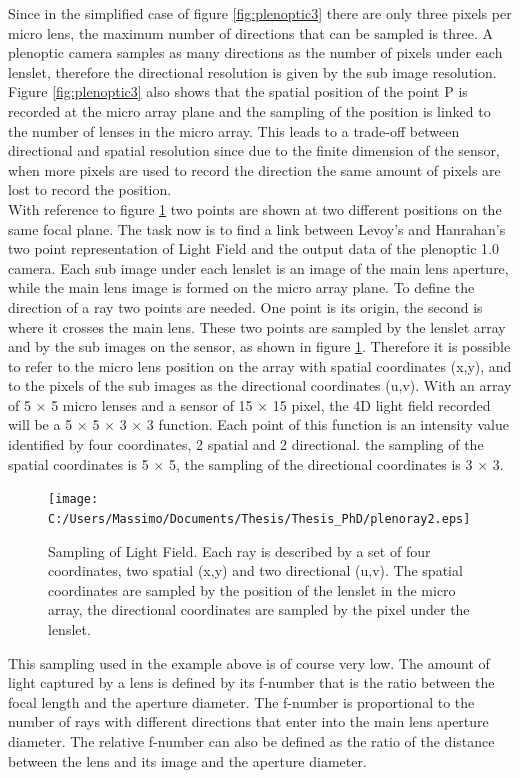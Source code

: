 Since in the simplified case of figure \ref{fig:plenoptic3} there are only three pixels per micro lens, the maximum number of directions that can be sampled is three. A plenoptic camera samples as many directions as the number of pixels under each lenslet, therefore the directional resolution is given by the sub image resolution. Figure \ref{fig:plenoptic3} also shows that the spatial position of the point P is recorded at the micro array plane and the sampling of the position is linked to the number of lenses in the micro array. This leads to a trade-off between directional and spatial resolution since due to the finite dimension of the sensor, when more pixels are used to record the direction the same amount of pixels are lost to record the position. \\
With reference to figure \ref{fig:plenoptic4} two points are shown at two different positions on the same focal plane. The task now is to find a link between Levoy's and Hanrahan's two point representation of Light Field \cite{levoy1996light,levoy2006microscope} and the output data of the plenoptic 1.0 camera. Each sub image under each lenslet is an image of the main lens aperture, while the main lens image is formed on the micro array plane. To define the direction of a ray two points are needed. One point is its origin, the second is where it crosses the main lens. These two points are sampled by the lenslet array and by the sub images on the sensor, as shown in figure \ref{fig:plenoptic4}. Therefore it is possible to refer to the micro lens position on the array with spatial coordinates (x,y), and to the pixels of the sub images as the directional coordinates (u,v). With an array of 5 $\times$ 5 micro lenses and a sensor of 15 $\times$ 15 pixel, the 4D light field recorded will be a 5 $\times$ 5 $\times$ 3 $\times$ 3 function. Each point of this function is an intensity value identified by four coordinates, 2 spatial and 2 directional. the sampling of the spatial coordinates is 5 $\times$ 5, the sampling of the directional coordinates is 3 $\times$ 3. 
\begin{figure}[H]
	\centering
	\texttt{[image: C:/Users/Massimo/Documents/Thesis/Thesis\_PhD/plenoray2.eps]}
	\caption{\label{fig:plenoptic4} Sampling of Light Field. Each ray is described by a set of four coordinates, two spatial (x,y) and two directional (u,v). The spatial coordinates are sampled by the position of the lenslet in the micro array, the directional coordinates are sampled by the pixel under the lenslet.}
\end{figure}
This sampling used in the example above is of course very low. The amount of light captured by a lens is defined by its f-number that is the ratio between the focal length and the aperture diameter. The f-number is proportional to the number of rays with different directions that enter into the main lens aperture diameter. The relative f-number can also be defined as the ratio of the distance between the lens and its image and the aperture diameter. 
